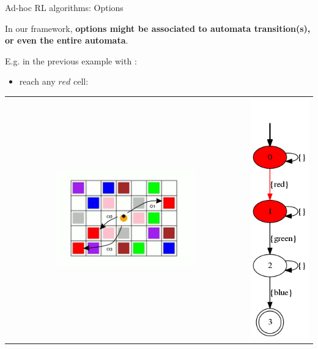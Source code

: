 \documentclass{beamer}
\begin{document}
\begin{frame}{Ad-hoc RL algorithms: Options}
	
	In our framework, \textbf{options might be associated to automata transition(s), or even the entire automata}.
	
	E.g. in the previous example with \Sapientino:
	\begin{itemize}
		\item reach any $red$ cell:
	\end{itemize}
	\begin{table}
		
		\begin{tabular}{c c}
			\includegraphics[width=0.6\textwidth]{images/sapientino-option-red}
			&
			\includegraphics[height=0.6\textheight]{images/sapientino-simple-dfa-red-arrow}
		\end{tabular}
		
	\end{table}
	
\end{frame}
\end{document}
